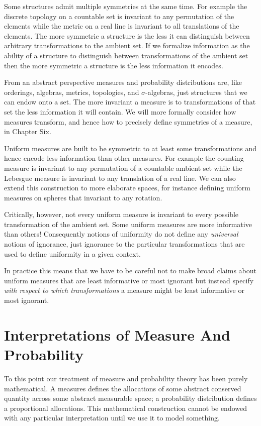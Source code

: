 \documentclass[
  letterpaper,
  DIV=11,
  numbers=noendperiod]{scrartcl}
\begin{document}
Some structures admit multiple symmetries at the same time. For example
the discrete topology on a countable set is invariant to any permutation
of the elements while the metric on a real line is invariant to all
translations of the elements. The more symmetric a structure is the less
it can distinguish between arbitrary transformations to the ambient set.
If we formalize information as the ability of a structure to distinguish
between transformations of the ambient set then the more symmetric a
structure is the less information it encodes.

From an abstract perspective measures and probability distributions are,
like orderings, algebras, metrics, topologies, and \(\sigma\)-algebras,
just structures that we can endow onto a set. The more invariant a
measure is to transformations of that set the less information it will
contain. We will more formally consider how measures transform, and
hence how to precisely define symmetries of a measure, in Chapter Six.

Uniform measures are built to be symmetric to at least some
transformations and hence encode less information than other measures.
For example the counting measure is invariant to any permutation of a
countable ambient set while the Lebesgue measure is invariant to any
translation of a real line. We can also extend this construction to more
elaborate spaces, for instance defining uniform measures on spheres that
invariant to any rotation.

Critically, however, not every uniform measure is invariant to every
possible transformation of the ambient set. Some uniform measures are
more informative than others! Consequently notions of uniformity do not
define any \emph{universal} notions of ignorance, just ignorance to the
particular transformations that are used to define uniformity in a given
context.

In practice this means that we have to be careful not to make broad
claims about uniform measures that are least informative or most
ignorant but instead specify \emph{with respect to which
transformations} a measure might be least informative or most ignorant.

\hypertarget{sec:interpretations}{%
\section{Interpretations of Measure And
Probability}\label{sec:interpretations}}

To this point our treatment of measure and probability theory has been
purely mathematical. A measures defines the allocations of some abstract
conserved quantity across some abstract measurable space; a probability
distribution defines a proportional allocations. This mathematical
construction cannot be endowed with any particular interpretation until
we use it to model something.
\end{document}

